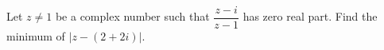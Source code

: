 Let $z\ne1$ be a complex number such that $\dfrac{z-i}{z-1}$ has zero real part. Find the minimum of $|z-(2+2i)|$.
